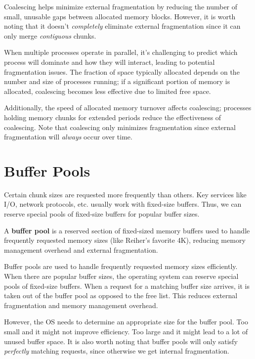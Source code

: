 \documentclass{report}
\newcommand{\definitionBegin}[1]{\begin{tcolorbox}[title={Definition: #1}]}
\newcommand{\definitionEnd}{\end{tcolorbox}}
\begin{document}
Coalescing helps minimize external fragmentation by reducing the number of small, unusable gaps
between allocated memory blocks. However, it is worth noting that it doesn't \textit{completely}
eliminate external fragmentation since it can only merge \textit{contiguous} chunks.

When multiple processes operate in parallel, it's challenging to predict which process will dominate
and how they will interact, leading to potential fragmentation issues. The fraction of space
typically allocated depends on the number and size of processes running; if a significant portion of
memory is allocated, coalescing becomes less effective due to limited free space.

Additionally, the speed of allocated memory turnover affects coalescing; processes holding memory
chunks for extended periods reduce the effectiveness of coalescing. Note that coalescing only
minimizes fragmentation since external fragmentation will \textit{always} occur over time.


\section{Buffer Pools}
Certain chunk sizes are requested more frequently than others. Key services like I/O, network
protocols, etc. usually work with fixed-size buffers. Thus, we can reserve special pools of
fixed-size buffers for popular buffer sizes.

\definitionBegin{Buffer Pool}
A \textbf{buffer pool} is a reserved section of fixed-sized memory buffers used to handle frequently
requested memory sizes (like Reiher's favorite 4K), reducing memory management overhead and external
fragmentation.
\definitionEnd

Buffer pools are used to handle frequently requested memory sizes efficiently. When there are
popular buffer sizes, the operating system can reserve special pools of fixed-size
buffers. When a request for a matching buffer size arrives, it is taken out of the buffer pool as
opposed to the free list. This reduces external fragmentation and memory management overhead.

However, the OS needs to determine an appropriate size for the buffer pool. Too small and it might
not improve efficiency. Too large and it might lead to a lot of unused buffer space.
It is also worth noting that buffer pools will only satisfy \textit{perfectly} matching requests,
since otherwise we get internal fragmentation.
\end{document}
